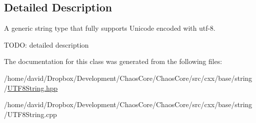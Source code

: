 \subsection{Detailed Description}
A generic string type that fully supports Unicode encoded with utf-\/8. 

T\-O\-D\-O\-: detailed description 

The documentation for this class was generated from the following files\-:\begin{DoxyCompactItemize}
\item 
/home/david/\-Dropbox/\-Development/\-Chaos\-Core/\-Chaos\-Core/src/cxx/base/string/\hyperlink{_u_t_f8_string_8hpp}{U\-T\-F8\-String.\-hpp}\item 
/home/david/\-Dropbox/\-Development/\-Chaos\-Core/\-Chaos\-Core/src/cxx/base/string/U\-T\-F8\-String.\-cpp\end{DoxyCompactItemize}
